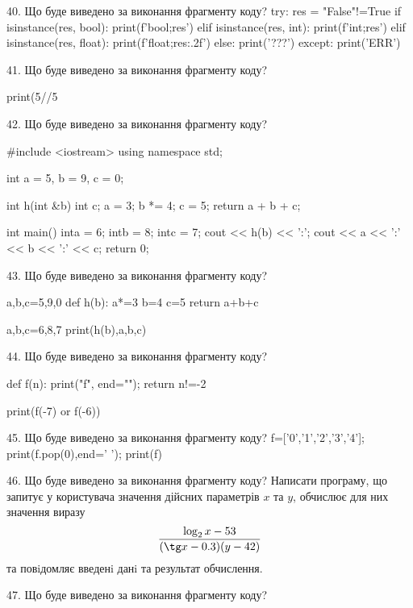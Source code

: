 \documentclass[11pt]{article}
\begin{document}

40. Що буде виведено за виконання фрагменту коду?
try:
    res = "False"!=True
    if isinstance(res, bool):
        print(f'bool;{res}')
    elif isinstance(res, int):
        print(f'int;{res}')
    elif isinstance(res, float):
        print(f'float;{res:.2f}')
    else:
        print('???')
except:
    print('ERR')


41. Що буде виведено за виконання фрагменту коду?

print(5//5%


42. Що буде виведено за виконання фрагменту коду?

#include <iostream>
using namespace std;

int a = 5, b = 9, c = 0;

int h(int &b){
int c;    a = 3;
    b *= 4;
    c = 5;
    return a + b + c;
}

int main(){
    inta = 6;
    intb = 8;
    intc = 7;
    cout << h(b) << ':';
    cout << a << ':' << b << ':' << c;
    return 0; 
}


43. Що буде виведено за виконання фрагменту коду?

a,b,c=5,9,0
def h(b):
    a*=3
    b=4
    c=5
    return a+b+c

a,b,c=6,8,7
print(h(b),a,b,c)


44. Що буде виведено за виконання фрагменту коду?

def f(n):
    print("f", end="");
    return n!=-2

print(f(-7) or f(-6))


45. Що буде виведено за виконання фрагменту коду?
f=['0','1','2','3','4']; print(f.pop(0),end=' '); print(f)

46. Що буде виведено за виконання фрагменту коду?
Написати програму, що запитує у користувача значення дійсних параметрів $x$ та $y$, обчислює для них значення виразу 
$$\frac{\log_{2} x - 53}{(\tg x - 0.3) (y - 42)}$$ 
та повiдомляє введенi данi та результат обчислення.



47. Що буде виведено за виконання фрагменту коду?
\end{document}
